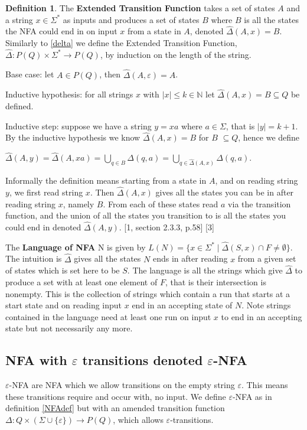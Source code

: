 \documentclass[a4paper,12pt]{report}
\theoremstyle{definition}
\newtheorem{definition}{Definition}[subsection]
\begin{document}
\begin{definition}
\label{DeltaDef}
The \textbf{Extended Transition Function} takes a set of states $A$ and a string $x\in\Sigma^*$ as inputs and produces a set of states $B$ where $B$ is all the states the NFA could end in on input $x$ from a state in $A$, denoted $\hat{\Delta}(A,x)=B$. 
Similarly to \ref{delta} we define the Extended Transition Function, $\hat{\Delta}: P(Q)\times \Sigma^* \rightarrow P(Q) $, by induction on the length of the string.


Base case: let $A\in P(Q)$,  then $\hat{\Delta}(A, \varepsilon)= A$. 

Inductive hypothesis: for all strings $x$ with $|x|\leq k \in \mathbb{N}$ let $\hat{\Delta}(A, x)= B \subseteq Q$ be defined. 

Inductive step: suppose we have a string $y=xa$ where $a\in \Sigma$, that is $|y|=k+1$. By the inductive hypothesis we know $\hat{\Delta}(A,x)=B$ for $B$ $\subseteq Q$, hence we define

$\hat{\Delta}(A,y)=\hat{\Delta}(A,xa)=\bigcup\limits_{q\in B} \Delta(q,a) = \bigcup\limits_{q\in \hat{\Delta}(A,x)} \Delta(q,a)$.

Informally the definition means starting from a state in $A$, and on reading string $y$, we first read string $x$. Then $\hat{\Delta}(A,x)$ gives all the states you can be in after reading string $x$, namely $B$. From each of these states read $a$ via the transition function, and the  union of all the states you transition to is all the states you could end in denoted $\hat{\Delta}(A,y)$. 
[1, section 2.3.3, p.58] [3]

\parskip 0.1in The \textbf{Language of NFA} N is given by $L(N)=\{x\in\Sigma^* \mid \hat{\Delta}(S,x)\cap F\neq \emptyset\}$. The intuition is $\hat{\Delta}$ gives all the states $N$ ends in after reading $x$ from a given set of states which is set here to be $S$. The language is all the strings which give $\hat{\Delta}$ to produce a set with at least one element of $F$, that is their intersection is nonempty. This is the collection of strings which contain a run that starts at a start state and on reading input $x$ end in an accepting state of $N$. Note strings contained in the language need at least one run on input $x$ to end in an accepting state but not necessarily any more. 
\end{definition}

\subsection{NFA with $\varepsilon$ transitions denoted $\varepsilon$-NFA}
 $\varepsilon$-NFA are NFA which we allow transitions on the empty string $\varepsilon$. This means these transitions require and occur with, no input. We define $\varepsilon$-NFA as in definition \ref{NFAdef} but with an amended transition function $\Delta: Q \times (\Sigma \cup\{\varepsilon\}) \rightarrow P(Q)$, which allows $\varepsilon$-transitions. 
\end{document}
